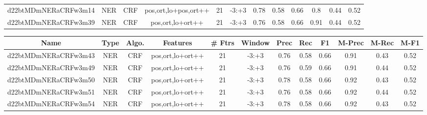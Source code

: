 \documentclass[a4paper]{article}
\begin{document}
\begin{landscape}
\begin{center}
\begin{tabular}{ |c|c|c|c|c|c|c|c|c|c|c|c|}
 	
 
 	
 		
 		\small{ d22btMDmNERaCRFw3m14 } & NER & CRF & pos,ort,lo+pos,ort++  &  21 &  -3:+3  &  0.78 & 0.58 & 0.66  &  0.8 & 0.44 & 0.52 \\
 		

 	
 
 	
 		
 		\small{ d22btMDmNERaCRFw3m39 } & NER & CRF & pos,ort,lo+ort++  &  21 &  -3:+3  &  0.76 & 0.58 & 0.66  &  0.91 & 0.44 & 0.52 \\
 		
 \hline
\end{tabular}
\end{center}




\begin{center}
\begin{tabular}{ |c|c|c|c|c|c|c|c|c|c|c|c|} 
 \hline
 	Name & Type & Algo. & Features & \# Ftrs & Window & Prec & Rec & F1 & M-Prec & M-Rec & M-F1\\
 \hline

 		

 	
 
 	
 		
 		\small{ d22btMDmNERaCRFw3m43 } & NER & CRF & pos,ort,lo+ort++  &  21 &  -3:+3  &  0.76 & 0.58 & 0.66  &  0.91 & 0.43 & 0.52 \\
 		

 	
 
 	
 		
 		\small{ d22btMDmNERaCRFw3m49 } & NER & CRF & pos,ort,lo+ort++  &  21 &  -3:+3  &  0.76 & 0.59 & 0.66  &  0.91 & 0.44 & 0.52 \\
 		

 	
 
 	
 		
 		\small{ d22btMDmNERaCRFw3m50 } & NER & CRF & pos,ort,lo+ort++  &  21 &  -3:+3  &  0.78 & 0.58 & 0.66  &  0.92 & 0.43 & 0.52 \\
 		

 	
 
 	
 		
 		\small{ d22btMDmNERaCRFw3m51 } & NER & CRF & pos,ort,lo+ort++  &  21 &  -3:+3  &  0.76 & 0.58 & 0.66  &  0.92 & 0.44 & 0.52 \\
 		

 	
 
 	
 		
 		\small{ d22btMDmNERaCRFw3m54 } & NER & CRF & pos,ort,lo+ort++  &  21 &  -3:+3  &  0.78 & 0.58 & 0.66  &  0.92 & 0.43 & 0.52 \\
 		


\end{tabular}
\end{center}
\end{landscape}
\end{document}
